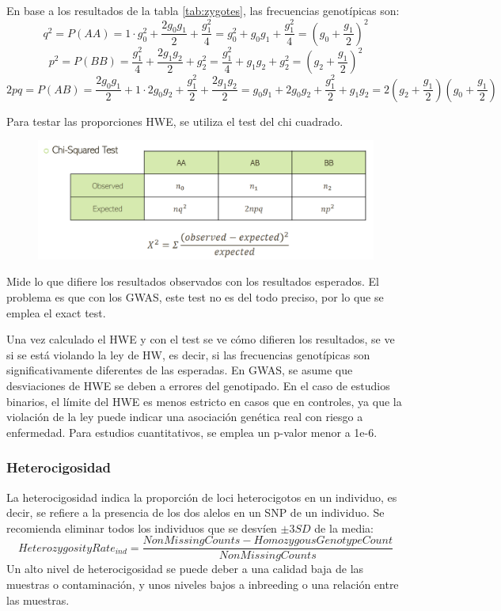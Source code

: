 En base a los resultados de la tabla \ref{tab:zygotes}, las frecuencias genotípicas son:
$$q^2 = P(AA) = 1 \cdot g_0^2 + \frac{2g_0g_1}{2} + \frac{g_1^2}{4} = g_0^2 + g_0g_1 + \frac{g_1^2}{4} = (g_0 + \frac{g_1}{2})^2$$
$$p^2 = P(BB) = \frac{g_1^2}{4} + \frac{2g_1g_2}{2} + g_2^2 = \frac{g_1^2}{4} + g_1g_2 + g_2^2 = (g_2 + \frac{g_1}{2})^2$$
$$2pq = P(AB) = \frac{2g_0g_1}{2} + 1 \cdot 2g_0g_2 + \frac{g_1^2}{2} + \frac{2g_1g_2}{2} = g_0g_1 + 2g_0g_2 + \frac{g_1^2}{2} + g_1g_2 = 2(g_2 + \frac{g_1}{2})(g_0 + \frac{g_1}{2})$$

Para testar las proporciones HWE, se utiliza el test del chi cuadrado.

\begin{figure}[htbp]
\centering
\includegraphics[width = \textwidth]{figs/chi-cuadrado.png}
\end{figure}

Mide lo que difiere los resultados observados con los resultados esperados. El problema es que con los GWAS, este test no es del todo preciso, por lo que se emplea el exact test.

Una vez calculado el HWE y con el test se ve cómo difieren los resultados, se ve si se está violando la ley de HW, es decir, si las frecuencias genotípicas son significativamente diferentes de las esperadas. En GWAS, se asume que desviaciones de HWE se deben a errores del genotipado. En el caso de estudios binarios, el límite del HWE es menos estricto en casos que en controles, ya que la violación de la ley puede indicar una asociación genética real con riesgo a enfermedad. Para estudios cuantitativos, se emplea un p-valor menor a 1e-6. 

\subsubsection{Heterocigosidad}
La heterocigosidad indica la proporción de loci heterocigotos en un individuo, es decir, se refiere a la presencia de los dos alelos en un SNP de un individuo. Se recomienda eliminar todos los individuos que se desvíen $\pm 3 SD$ de la media:
$$HeterozygosityRate_{ind} = \frac{NonMissingCounts - HomozygousGenotypeCount}{NonMissingCounts}$$
Un alto nivel de heterocigosidad se puede deber a una calidad baja de las muestras o contaminación, y unos niveles bajos a inbreeding o una relación entre las muestras.

